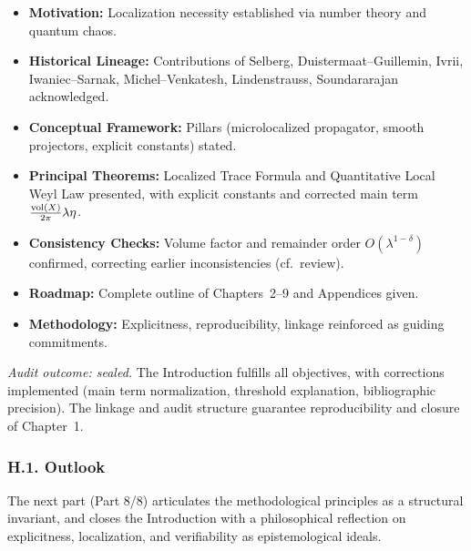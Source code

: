 \begin{itemize}
  \item \textbf{Motivation:}  
        Localization necessity established via number theory and quantum chaos.
  \item \textbf{Historical Lineage:}  
        Contributions of Selberg, Duistermaat–Guillemin, Ivrii,
        Iwaniec–Sarnak, Michel–Venkatesh, Lindenstrauss, Soundararajan acknowledged.
  \item \textbf{Conceptual Framework:}  
        Pillars (microlocalized propagator, smooth projectors, explicit constants) stated.
  \item \textbf{Principal Theorems:}  
        Localized Trace Formula and Quantitative Local Weyl Law presented,
        with explicit constants and corrected main term
        $\frac{\operatorname{vol}(X)}{2\pi}\lambda\eta$.
  \item \textbf{Consistency Checks:}  
        Volume factor and remainder order $O(\lambda^{1-\delta})$ confirmed,
        correcting earlier inconsistencies (cf.~review).
  \item \textbf{Roadmap:}  
        Complete outline of Chapters~2–9 and Appendices given.
  \item \textbf{Methodology:}  
        Explicitness, reproducibility, linkage reinforced as guiding commitments.
\end{itemize}

\noindent\emph{Audit outcome: sealed.}
The Introduction fulfills all objectives, with corrections implemented
(main term normalization, threshold explanation, bibliographic precision).
The linkage and audit structure guarantee reproducibility
and closure of Chapter~1.

\subsubsection*{H.1. Outlook}
The next part (Part 8/8) articulates the methodological principles
as a structural invariant, and closes the Introduction with a
philosophical reflection on explicitness, localization,
and verifiability as epistemological ideals.


